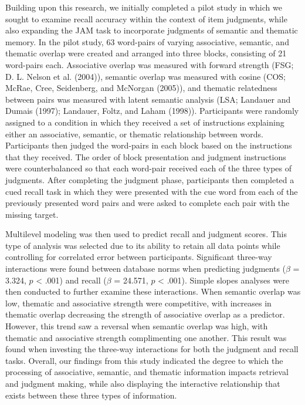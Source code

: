 \documentclass[english,man]{apa6}
\theoremstyle{definition}
\theoremstyle{definition}
\theoremstyle{definition}
\theoremstyle{remark}
\begin{document}
Building upon this research, we initially completed a pilot study in
which we sought to examine recall accuracy within the context of item
judgments, while also expanding the JAM task to incorporate judgments of
semantic and thematic memory. In the pilot study, 63 word-pairs of
varying associative, semantic, and thematic overlap were created and
arranged into three blocks, consisting of 21 word-pairs each.
Associative overlap was measured with forward strength (FSG; D. L.
Nelson et al. (2004)), semantic overlap was measured with cosine (COS;
McRae, Cree, Seidenberg, and McNorgan (2005)), and thematic relatedness
between pairs was measured with latent semantic analysis (LSA; Landauer
and Dumais (1997); Landauer, Foltz, and Laham (1998)). Participants were
randomly assigned to a condition in which they received a set of
instructions explaining either an associative, semantic, or thematic
relationship between words. Participants then judged the word-pairs in
each block based on the instructions that they received. The order of
block presentation and judgment instructions were counterbalanced so
that each word-pair received each of the three types of judgments. After
completing the judgment phase, participants then completed a cued recall
task in which they were presented with the cue word from each of the
previously presented word pairs and were asked to complete each pair
with the missing target.

Multilevel modeling was then used to predict recall and judgment scores.
This type of analysis was selected due to its ability to retain all data
points while controlling for correlated error between participants.
Significant three-way interactions were found between database norms
when predicting judgments (\(\beta\) = 3.324, \(p\) \textless{} .001)
and recall (\(\beta\) = 24.571, \(p\) \textless{} .001). Simple slopes
analyses were then conducted to further examine these interactions. When
semantic overlap was low, thematic and associative strength were
competitive, with increases in thematic overlap decreasing the strength
of associative overlap as a predictor. However, this trend saw a
reversal when semantic overlap was high, with thematic and associative
strength complimenting one another. This result was found when investing
the three-way interactions for both the judgment and recall tasks.
Overall, our findings from this study indicated the degree to which the
processing of associative, semantic, and thematic information impacts
retrieval and judgment making, while also displaying the interactive
relationship that exists between these three types of information.
\end{document}
